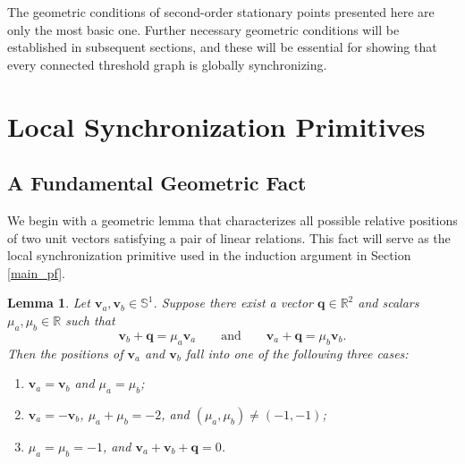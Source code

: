 \documentclass[11pt,reqno]{amsart}
\newtheorem{lemma}[theorem]{Lemma}
\theoremstyle{definition}
\begin{document}
The geometric conditions of second-order stationary points presented here are only the most basic one.
Further necessary geometric conditions will be established in subsequent
sections, and these will be essential for showing that every connected
threshold graph is globally synchronizing.
\section{Local Synchronization Primitives}\label{Primitives}
\subsection{A Fundamental Geometric Fact}
We begin with a geometric lemma that characterizes all possible relative positions of two unit vectors satisfying a pair of linear relations.
This fact will serve as the local synchronization primitive used in the induction argument in Section \ref{main_pf}.

\begin{lemma}\label{false-twins}
Let $\boldsymbol{v}_a, \boldsymbol{v}_b \in \mathbb{S}^1$.
Suppose there exist a vector $\boldsymbol{q} \in \mathbb{R}^2$ and scalars $\mu_a, \mu_b \in \mathbb{R}$ such that
\begin{equation}\label{geo}
	\boldsymbol{v}_b + \boldsymbol{q} = \mu_a \boldsymbol{v}_a
\qquad\text{and}\qquad
\boldsymbol{v}_a + \boldsymbol{q} = \mu_b \boldsymbol{v}_b .
\end{equation}
Then the positions of $\boldsymbol{v}_a$ and $\boldsymbol{v}_b$ fall into one of the following three cases:
\begin{enumerate}[label=(\arabic*), leftmargin=*, itemsep=0.5em]
    \item $\boldsymbol{v}_a = \boldsymbol{v}_b$ and $\mu_a = \mu_b$;

    \item $\boldsymbol{v}_a = -\boldsymbol{v}_b$, $\mu_a + \mu_b = -2$, and $(\mu_a,\mu_b)\neq (-1,-1)$;

    \item $\mu_a = \mu_b = -1$, and $\boldsymbol{v}_a + \boldsymbol{v}_b + \boldsymbol{q} = 0$.
\end{enumerate}
\end{lemma}
\end{document}
